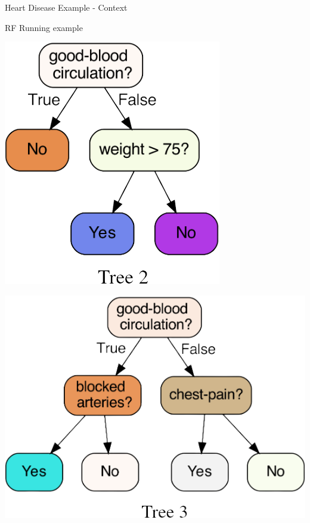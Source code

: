 \begin{frame}{Heart Disease Example - Context}
\begin{block}{RF Running example}
\begin{center}
\begin{center}
\begin{minipage}{0.175\linewidth}
            \end{minipage}
            \hspace{8pt}
            \begin{minipage}{0.175\linewidth}
                \includegraphics[width=\textwidth]{resources/RF_2.png}
            \end{minipage}
            \hspace{8pt}
            \begin{minipage}{0.265\linewidth}
                \includegraphics[width=\textwidth]{resources/RF_3.png}

\end{minipage}
\end{center}
\end{center}
\end{block}
\end{frame}
